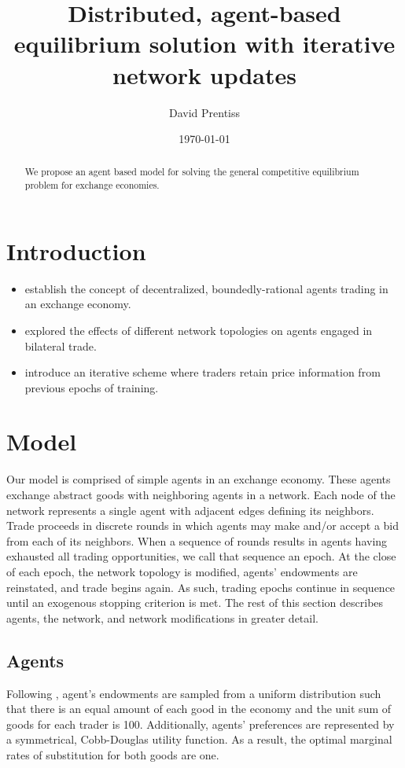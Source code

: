 \documentclass[smallextended]{svjour3}
\begin{document}
\title{Distributed, agent-based equilibrium solution with iterative network
updates}
\author{David Prentiss}
\date{\today}
\maketitle
\begin{abstract}
  We propose an agent based model for solving the general competitive
  equilibrium problem for exchange economies.
\end{abstract}
\section{Introduction}
\begin{itemize}
\item \cite{albin1992decentralized} establish the concept of decentralized,
  boundedly-rational agents trading in an exchange economy.
\item \cite{wilhite2001bilateral} explored the effects of different network
  topologies on agents engaged in bilateral trade.
\item \cite{sunder2002simple} introduce an iterative scheme where traders retain
  price information from previous epochs of training.
\end{itemize}
\section{Model}
Our model is comprised of simple agents in an exchange economy.
These agents exchange abstract goods with neighboring agents in a network.
Each node of the network represents a single agent with adjacent edges defining
its neighbors.
Trade proceeds in discrete rounds in which agents may make and/or accept a bid
from each of its neighbors.
When a sequence of rounds results in agents having exhausted all trading
opportunities, we call that sequence an epoch.
At the close of each epoch, the network topology is modified, agents'
endowments are reinstated, and trade begins again.
As such, trading epochs continue in sequence until an exogenous stopping
criterion is met.
The rest of this section describes agents, the network, and network
modifications in greater detail.

\subsection{Agents}
Following \cite{albin1992decentralized}, agent's endowments are sampled from a uniform distribution such that there is an equal amount of each good in the economy and the unit sum of goods for each trader is 100.
Additionally, agents' preferences are represented by a symmetrical, Cobb-Douglas utility function.
As a result, the optimal marginal rates of substitution for both goods are one.
\end{document}
